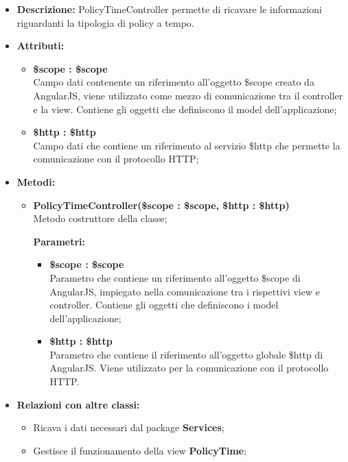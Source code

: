 \begin{itemize}
	\item \textbf{Descrizione:} PolicyTimeController permette di ricavare le informazioni riguardanti la tipologia di policy a tempo.
	\item \textbf{Attributi:}
	\begin{itemize}
		
		\item \textbf{\$scope : \$scope}\\
		Campo dati contenente un riferimento all'oggetto \$scope creato da AngularJS, viene utilizzato come mezzo di comunicazione tra il controller e la view. Contiene gli oggetti che definiscono il model dell'applicazione;
		
		\item \textbf{\$http : \$http }\\
		Campo dati che contiene un riferimento al servizio \$http che permette la comunicazione con il protocollo HTTP;
		
	\end{itemize}
	\item \textbf{Metodi:}
	\begin{itemize}
		
		\item \textbf{PolicyTimeController(\$scope : \$scope, \$http : \$http)}\\
		Metodo costruttore della classe;
		\begin{description}
			\item[\textbf{Parametri:}]
		\end{description}
		\begin{itemize}
			\item \textbf{\$scope : \$scope}\\
			Parametro che contiene un riferimento all'oggetto \$scope di AngularJS, impiegato nella comunicazione tra i rispettivi view e controller. Contiene gli oggetti che definiscono i model dell'applicazione;
			
			\item \textbf{\$http : \$http}\\
			Parametro che contiene il riferimento all'oggetto globale \$http di AngularJS. Viene utilizzato per la comunicazione con il protocollo HTTP.
			
		\end{itemize}				
	\end{itemize}
	\item \textbf{Relazioni con altre classi:}
	\begin{itemize}
		\item Ricava i dati necessari dal package \textbf{Services};
		\item Gestisce il funzionamento della view \textbf{PolicyTime};
	\end{itemize}
\end{itemize}

